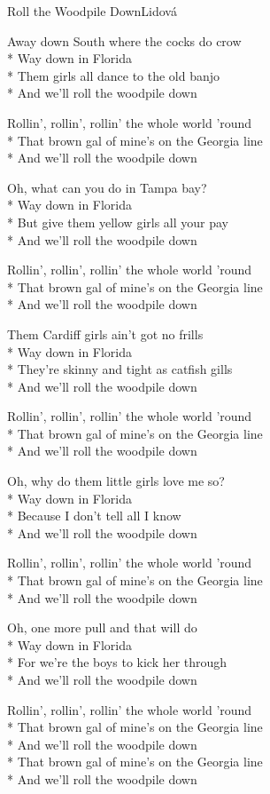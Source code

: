 \documentclass[10.5pt]{book}
\begin{document}
\begin{poem}{Roll the Woodpile Down}{Lidová}

\settowidth{\versewidth}{Rollin', rollin', rollin' the whole world 'round}

Away down South where the cocks do crow\\*
Way down in Florida\\*
Them girls all dance to the old banjo\\*
And we'll roll the woodpile down

Rollin', rollin', rollin' the whole world 'round\\*
That brown gal of mine's on the Georgia line\\*
And we'll roll the woodpile down

Oh, what can you do in Tampa bay?\\*
Way down in Florida\\*
But give them yellow girls all your pay\\*
And we'll roll the woodpile down

Rollin', rollin', rollin' the whole world 'round\\*
That brown gal of mine's on the Georgia line\\*
And we'll roll the woodpile down

Them Cardiff girls ain't got no frills\\*
Way down in Florida\\*
They're skinny and tight as catfish gills\\*
And we'll roll the woodpile down

Rollin', rollin', rollin' the whole world 'round\\*
That brown gal of mine's on the Georgia line\\*
And we'll roll the woodpile down

Oh, why do them little girls love me so?\\*
Way down in Florida\\*
Because I don't tell all I know\\*
And we'll roll the woodpile down

Rollin', rollin', rollin' the whole world 'round\\*
That brown gal of mine's on the Georgia line\\*
And we'll roll the woodpile down

Oh, one more pull and that will do\\*
Way down in Florida\\*
For we're the boys to kick her through\\*
And we'll roll the woodpile down

Rollin', rollin', rollin' the whole world 'round\\*
That brown gal of mine's on the Georgia line\\*
And we'll roll the woodpile down\\*
That brown gal of mine's on the Georgia line\\*
And we'll roll the woodpile down

\end{poem}
\end{document}
